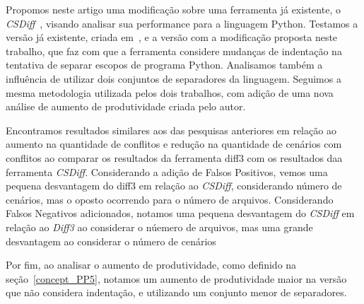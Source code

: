 Propomos neste artigo uma modificação sobre uma ferramenta já existente, o \emph{CSDiff}~\cite{clem21},
visando analisar sua performance para a linguagem Python. Testamos a versão já existente, criada em~\cite{heitor21},
e a versão com a modificação proposta neste trabalho, que faz com que a ferramenta considere mudanças de indentação na
tentativa de separar escopos de programa Python. Analisamos também a influência de utilizar dois conjuntos de separadores da
linguagem. Seguimos a mesma metodologia utilizada pelos dois trabalhos, com adição de uma nova análise
de aumento de produtividade criada pelo autor.

Encontramos resultados similares aos das pesquisas anteriores em relação ao aumento na quantidade de conflitos e redução na
quantidade de cenários com conflitos ao comparar os resultados da ferramenta diff3 com os resultados daa ferramenta \emph{CSDiff}.
Considerando a adição de Falsos Positivos, vemos uma pequena desvantagem do diff3 em relação ao \emph{CSDiff}, considerando número de
cenários, mas o oposto ocorrendo para o número de arquivos. Considerando Falsos Negativos adicionados, notamos uma pequena
desvantagem do \emph{CSDiff} em relação ao \emph{Diff3} ao considerar o núemero de
arquivos, mas uma grande desvantagem ao considerar o número de cenários

Por fim, ao analisar o aumento de produtividade, como definido na seção~\ref{concept_PP5}, notamos um aumento de
produtividade maior na versão que não considera indentação, e utilizando um conjunto menor de separadores.


